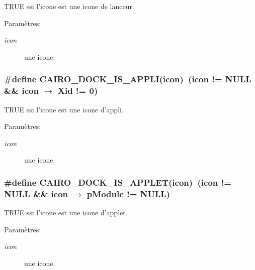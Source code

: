 TRUE ssi l'icone est une icone de lanceur. \begin{Desc}
\item[Paramètres:]
\begin{description}
\item[{\em icon}]une icone. \end{description}
\end{Desc}
\subsubsection{\setlength{\rightskip}{0pt plus 5cm}\#define CAIRO\_\-DOCK\_\-IS\_\-APPLI(icon)~(icon != NULL \&\& icon $\rightarrow$ Xid != 0)}\label{cairo-dock-icons_8h_761b6ff927a501c49e5c26849094a141}


TRUE ssi l'icone est une icone d'appli. \begin{Desc}
\item[Paramètres:]
\begin{description}
\item[{\em icon}]une icone. \end{description}
\end{Desc}
\subsubsection{\setlength{\rightskip}{0pt plus 5cm}\#define CAIRO\_\-DOCK\_\-IS\_\-APPLET(icon)~(icon != NULL \&\& icon $\rightarrow$ pModule != NULL)}\label{cairo-dock-icons_8h_71ae24f5e49a27e52e7175f0081e5f44}


TRUE ssi l'icone est une icone d'applet. \begin{Desc}
\item[Paramètres:]
\begin{description}
\item[{\em icon}]une icone. \end{description}
\end{Desc}
